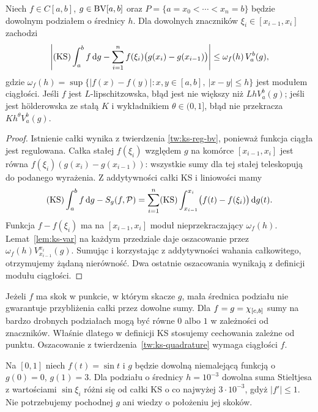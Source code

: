 \begin{twierdzenie}
\label{tw:ks-quadrature}
Niech $f\in C[a,b]$, $g\in\mathrm{BV}[a,b]$ oraz $P=\{a=x_0<\cdots<x_n=b\}$ będzie dowolnym podziałem o średnicy $h$. Dla dowolnych znaczników $\xi_i\in[x_{i-1},x_i]$ zachodzi
\[
 \left|(\mathrm{KS})\int_a^b f\,\mathrm dg-
 \sum_{i=1}^n f(\xi_i)\bigl(g(x_i)-g(x_{i-1})\bigr)\right|
 \le\omega_f(h)\,V_a^b(g),
\]
gdzie $\omega_f(h)=\sup\{|f(x)-f(y)|:x,y\in[a,b],\ |x-y|\le h\}$ jest modułem ciągłości. Jeśli $f$ jest $L$-lipschitzowska, błąd jest nie większy niż $LhV_a^b(g)$; jeśli jest h\"olderowska ze stałą $K$ i wykładnikiem $\theta\in(0,1]$, błąd nie przekracza $Kh^\theta V_a^b(g)$.
\end{twierdzenie}
\begin{proof}
Istnienie całki wynika z twierdzenia
\ref{tw:ks-reg-bv}, ponieważ funkcja ciągła jest
regulowana. Całka stałej $f(\xi_i)$ względem $g$
na komórce $[x_{i-1},x_i]$ jest równa
$f(\xi_i)(g(x_i)-g(x_{i-1}))$: wszystkie sumy
dla tej stałej teleskopują do podanego wyrażenia.
Z addytywności całki KS i liniowości mamy
\[
 (\mathrm{KS})\int_a^b f\,\mathrm dg-S_g(f,\mathcal P)
 =\sum_{i=1}^n(\mathrm{KS})\int_{x_{i-1}}^{x_i}\bigl(f(t)-f(\xi_i)\bigr)\,\mathrm dg(t).
\]
Funkcja $f-f(\xi_i)$ ma na $[x_{i-1},x_i]$ moduł nieprzekraczający $\omega_f(h)$. Lemat~\ref{lem:ks-var} na każdym przedziale daje oszacowanie przez $\omega_f(h)V_{x_{i-1}}^{x_i}(g)$. Sumując i korzystając z addytywności wahania całkowitego, otrzymujemy żądaną nierówność. Dwa ostatnie oszacowania wynikają z definicji modułu ciągłości.
\end{proof}

\begin{uwaga}
Jeżeli $f$ ma skok w punkcie, w którym skacze $g$, mała średnica podziału nie gwarantuje przybliżenia całki przez dowolne sumy. Dla $f=g=\chi_{[c,b]}$ sumy na bardzo drobnych podziałach mogą być równe $0$ albo $1$ w zależności od znaczników. Właśnie dlatego w definicji KS stosujemy cechowania zależne od punktu. Oszacowanie z twierdzenia~\ref{tw:ks-quadrature} wymaga ciągłości $f$.
\end{uwaga}

\begin{przyklad}
Na $[0,1]$ niech $f(t)=\sin t$ i $g$ będzie dowolną niemalejącą funkcją o $g(0)=0$, $g(1)=3$. Dla podziału o średnicy $h=10^{-3}$ dowolna suma Stieltjesa z wartościami $\sin\xi_i$ różni się od całki KS o co najwyżej $3\cdot10^{-3}$, gdyż $|f'|\le1$. Nie potrzebujemy pochodnej $g$ ani wiedzy o położeniu jej skoków.
\end{przyklad}

